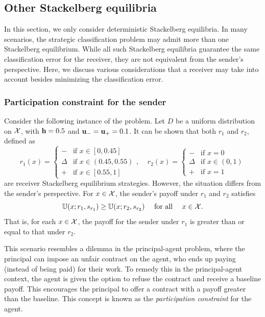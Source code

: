 \subsection{Other Stackelberg equilibria}\label{subsec:Other equilibria}
In this section, we only consider deterministic Stackelberg equilibria. In many scenarios, the strategic classification problem may admit more than one Stackelberg equilibrium. While all such Stackelberg equilibria guarantee the same classification error for the receiver, they are not equivalent from the sender's perspective. Here, we discuss various considerations that a receiver may take into account besides minimizing the classification error.

\subsubsection{Participation constraint for the sender}
Consider the following instance of the problem. Let $D$ be a uniform distribution on $\mathcal{X}$, with $\mathbf{h} = 0.5$ and $\mathbf{u_-} = \mathbf{u_+} = 0.1$. It can be shown that both $r_1$ and $r_2$, defined as
\begin{equation*}
r_1(x) = \begin{cases}
\minus & \text{if } x \in [0, 0.45] \\
\Delta & \text{if } x \in (0.45, 0.55) \\
\plus & \text{if } x \in [0.55, 1]
\end{cases}, \;\;\;\;
r_2(x) = \begin{cases}
\minus & \text{if } x = 0 \\
\Delta & \text{if } x \in (0, 1) \\
\plus & \text{if } x = 1
\end{cases}
\end{equation*}
are receiver Stackelberg equilibrium strategies. However, the situation differs from the sender's perspective. For $x \in \mathcal{X}$, the sender's payoff under $r_1$ and $r_2$ satisfies
\begin{equation}
\mathbb{U}(x; r_1, s_{r_1}) \geq \mathbb{U}(x; r_2, s_{r_2}) \text{ for all } x \in \cg{X}.
\end{equation}
That is, for each $x \in \mathcal{X}$, the payoff for the sender under $r_1$ is greater than or equal to that under $r_2$.

This scenario resembles a dilemma in the principal-agent problem, where the principal can impose an unfair contract on the agent, who ends up paying (instead of being paid) for their work. To remedy this in the principal-agent context, the agent is given the option to refuse the contract and receive a baseline payoff. This encourages the principal to offer a contract with a payoff greater than the baseline. This concept is known as the \textit{participation constraint} for the agent.

